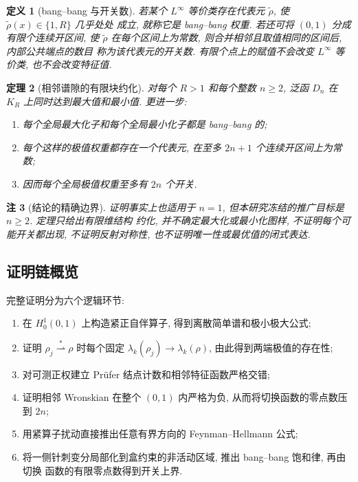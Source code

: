\documentclass[UTF8]{ctexart}
\newtheorem{theorem}{定理}[section]
\newtheorem{remark}[theorem]{注}
\newtheorem{definition}[theorem]{定义}
\begin{document}
\begin{definition}[bang--bang 与开关数]\label{def:bangbang}
若某个 $L^\infty$ 等价类存在代表元 $\tilde\rho$, 使 $\tilde\rho(x)\in\{1,R\}$ 几乎处处
成立, 就称它是 bang--bang 权重. 若还可将 $(0,1)$ 分成有限个连续开区间, 使
$\tilde\rho$ 在每个区间上为常数, 则合并相邻且取值相同的区间后, 内部公共端点的数目
称为该代表元的开关数. 有限个点上的赋值不会改变 $L^\infty$ 等价类, 也不会改变特征值.
\end{definition}

\begin{theorem}[相邻谱隙的有限块约化]\label{thm:main}
对每个 $R>1$ 和每个整数 $n\ge2$, 泛函 $D_n$ 在 $K_R$ 上同时达到最大值和最小值.
更进一步:
\begin{enumerate}
	\item 每个全局最大化子和每个全局最小化子都是 bang--bang 的;
	\item 每个这样的极值权重都存在一个代表元, 在至多 $2n+1$ 个连续开区间上为常数;
	\item 因而每个全局极值权重至多有 $2n$ 个开关.
\end{enumerate}
\end{theorem}

\begin{remark}[结论的精确边界]\label{rem:boundary}
证明事实上也适用于 $n=1$, 但本研究冻结的推广目标是 $n\ge2$. 定理只给出有限维结构
约化, 并不确定最大化或最小化图样, 不证明每个可能开关都出现, 不证明反射对称性,
也不证明唯一性或最优值的闭式表达.
\end{remark}

\subsection{证明链概览}

完整证明分为六个逻辑环节:
\begin{enumerate}
	\item 在 $H^1_0(0,1)$ 上构造紧正自伴算子, 得到离散简单谱和极小极大公式;
	\item 证明 $\rho_j\overset{*}{\rightharpoonup}\rho$ 时每个固定
		$\lambda_k(\rho_j)\to\lambda_k(\rho)$, 由此得到两端极值的存在性;
	\item 对可测正权建立 Pr\"ufer 结点计数和相邻特征函数严格交错;
	\item 证明相邻 Wronskian 在整个 $(0,1)$ 内严格为负, 从而将切换函数的零点数压到 $2n$;
	\item 用紧算子扰动直接推出任意有界方向的 Feynman--Hellmann 公式;
	\item 将一侧针刺变分局部化到盒约束的非活动区域, 推出 bang--bang 饱和律, 再由切换
		函数的有限零点数得到开关上界.
\end{enumerate}
\end{document}
